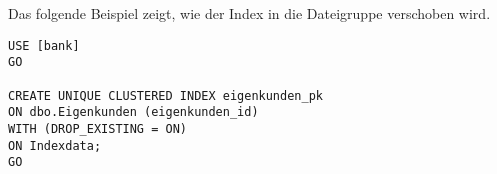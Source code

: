         Das folgende Beispiel zeigt, wie der Index 
        in die Dateigruppe  verschoben wird.
        \begin{lstlisting}[language=ms_sql, caption={Den Index
        \identifier{eigenkunden\_pk} in eine andere Dateigruppe verschieben},
        label=admin05_17]
USE [bank]
GO

CREATE UNIQUE CLUSTERED INDEX eigenkunden_pk
ON dbo.Eigenkunden (eigenkunden_id)
WITH (DROP_EXISTING = ON)
ON Indexdata;
GO
        \end{lstlisting}
        \begin{literaturinternet}
          \item \cite{ms175905}
        \end{literaturinternet}